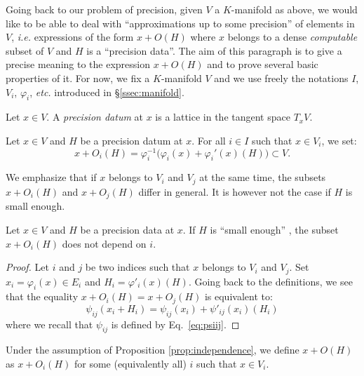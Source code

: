 \documentclass{amsart}
\begin{document}

Going back to our problem of precision, given $V$ a $K$-manifold as 
above, we would like to be able to deal with ``approximations up to some 
precision'' of elements in $V$, \emph{i.e.} expressions of the form $x + 
O(H)$ where $x$ belongs to a dense \emph{computable} subset of $V$ and 
$H$ is a ``precision data''.
The aim of this paragraph is to give a precise meaning to the expression 
$x + O(H)$ and to prove several basic properties of it.
For now, we fix a $K$-manifold $V$ and we use freely the notations $I$, 
$V_i$, $\varphi_i$, \emph{etc.} introduced in \S \ref{ssec:manifold}.

\begin{deftn}
Let $x \in V$. 
A \emph{precision datum} at $x$ is a lattice in the tangent space 
$T_x V$.
\end{deftn}

\begin{deftn}
Let $x \in V$ and $H$ be a precision datum at $x$.
For all $i \in I$ such that $x \in V_i$, we set:
$$x + O_i(H) = \varphi_i^{-1}\big(\varphi_i(x) + \varphi_i'(x)(H)\big) 
\subset V.$$
\end{deftn}

We emphasize that if $x$ belongs to $V_i$ and $V_j$ at the same time,
the subsets $x + O_i(H)$ and $x + O_j(H)$ differ in general. It is 
however not the case if $H$ is small enough.

\begin{prop}
\label{prop:independence}
Let $x \in V$ and $H$ be a precision data at $x$.
If $H$ is ``small enough'' , the subset $x + 
O_i(H)$ does not depend on $i$.
\end{prop}

\begin{proof}
Let $i$ and $j$ be two indices such that $x$ belongs to $V_i$ and $V_j$. 
Set $x_i = \varphi_i(x) \in E_i$ and $H_i = \varphi'_i(x)(H)$. Going 
back to the definitions, we see that the equality $x + O_i(H) = x + 
O_j(H)$ is equivalent to:
$$\psi_{ij}(x_i + H_i) = \psi_{ij}(x_i) + \psi'_{ij}(x_i)(H_i)$$ 
where we recall that $\psi_{ij}$ is defined by Eq.~\eqref{eq:psiij}.
\end{proof}

Under the assumption of Proposition \ref{prop:independence}, we define
$x + O(H)$ as $x + O_i(H)$ for some (equivalently all) $i$ such that
$x \in V_i$.
\end{document}
